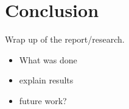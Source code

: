 \section{Conclusion}

Wrap up of the report/research. 

\begin{itemize}
  \item What was done
  \item explain results
  \item future work?
\end{itemize}
